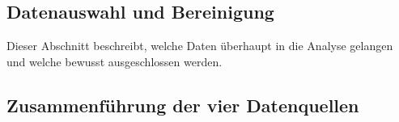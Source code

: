 \documentclass[12pt,a4paper]{article}
\begin{document}
\subsection{Datenauswahl und Bereinigung}
\label{sec:auswahl-bereinigung}

Dieser Abschnitt beschreibt, welche Daten überhaupt in die Analyse gelangen und
welche bewusst ausgeschlossen werden.


\subsection{Zusammenführung der vier Datenquellen}
\label{sec:integration}
\end{document}
